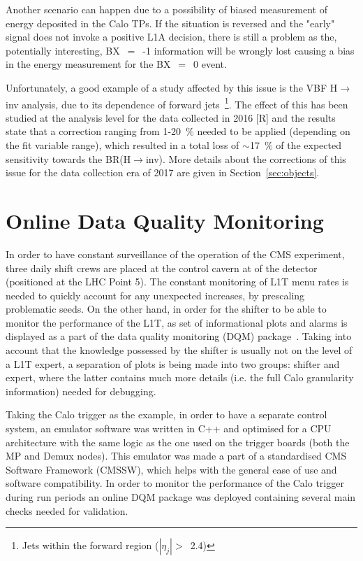 \hspace{10pt} Another scenario can happen due to a possibility of biased measurement of energy deposited in the Calo TPs. If the situation is reversed and the "early" signal does not invoke a positive L1A decision, there is still a problem as the, potentially interesting, BX~$=$~-1 information will be wrongly lost causing a bias in the energy measurement for the BX~$=$~0 event. 

\hspace{10pt} Unfortunately, a good example of a study affected by this issue is the VBF H$\rightarrow$inv analysis, due to its dependence of forward jets~\footnote{Jets within the forward region ($|\eta_j|>$~2.4)}. The effect of this has been studied at the analysis level for the data collected in 2016 [R] and the results state that a correction ranging from 1-20~\% needed to be applied (depending on the fit variable range), which resulted in a total loss of $\sim$17~\% of the expected sensitivity towards the BR(H$\rightarrow$inv). More details about the corrections of this issue for the data collection era of 2017 are given in Section~\ref{sec:objects}.


\section{Online Data Quality Monitoring}
\hspace{10pt} In order to have constant surveillance of the operation of the CMS experiment, three daily shift crews are placed at the control cavern at of the detector (positioned at the LHC Point 5). The constant monitoring of L1T menu rates is needed to quickly account for any unexpected increases, by prescaling problematic seeds. On the other hand, in order for the shifter to be able to monitor the performance of the L1T, as set of  informational plots and alarms is displayed as a part of the data quality monitoring (DQM) package~\cite{Antoni}. Taking into account that the knowledge possessed by the shifter is usually not on the level of a L1T expert, a separation of plots is being made into two groups: shifter and expert, where the latter contains much more details (i.e. the full Calo granularity information) needed for debugging.

\hspace{10pt} Taking the Calo trigger as the example, in order to have a separate control system, an emulator software was written in C++ and optimised for a CPU architecture with the same logic as the one used on the trigger boards (both the MP and Demux nodes). This emulator was made a part of a standardised CMS Software Framework (CMSSW), which helps with the general ease of use and software compatibility. In order to monitor the performance of the Calo trigger during run periods an online DQM package was deployed containing several main checks needed for validation.

